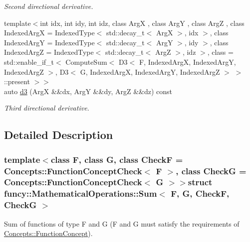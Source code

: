 \begin{DoxyCompactItemize}
\begin{DoxyCompactList}\small\item\em Second directional derivative. \end{DoxyCompactList}\item 
{\footnotesize template$<$int idx, int idy, int idz, class Arg\-X , class Arg\-Y , class Arg\-Z , class Indexed\-Arg\-X  = Indexed\-Type$<$ std\-::decay\-\_\-t$<$ Arg\-X $>$, idx $>$, class Indexed\-Arg\-Y  = Indexed\-Type$<$ std\-::decay\-\_\-t$<$ Arg\-Y $>$, idy $>$, class Indexed\-Arg\-Z  = Indexed\-Type$<$ std\-::decay\-\_\-t$<$ Arg\-Z $>$, idz $>$, class  = std\-::enable\-\_\-if\-\_\-t$<$                           Compute\-Sum$<$ D3$<$ F, Indexed\-Arg\-X, Indexed\-Arg\-Y, Indexed\-Arg\-Z $>$,                                       D3$<$ G, Indexed\-Arg\-X, Indexed\-Arg\-Y, Indexed\-Arg\-Z $>$ $>$\-::present $>$$>$ }\\auto \hyperlink{structfuncy_1_1MathematicalOperations_1_1Sum_aa19f58ea768dcbf17edfb6b1e3e78348}{d3} (Arg\-X \&\&dx, Arg\-Y \&\&dy, Arg\-Z \&\&dz) const 
\begin{DoxyCompactList}\small\item\em Third directional derivative. \end{DoxyCompactList}\end{DoxyCompactItemize}


\subsection{Detailed Description}
\subsubsection*{template$<$class F, class G, class Check\-F = Concepts\-::\-Function\-Concept\-Check$<$ F $>$, class Check\-G = Concepts\-::\-Function\-Concept\-Check$<$ G $>$$>$struct funcy\-::\-Mathematical\-Operations\-::\-Sum$<$ F, G, Check\-F, Check\-G $>$}

Sum of functions of type F and G (F and G must satisfy the requirements of \hyperlink{structfuncy_1_1Concepts_1_1FunctionConcept}{Concepts\-::\-Function\-Concept}). 


